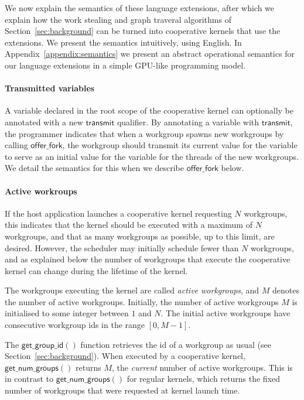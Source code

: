 \documentclass[nocopyrightspace,10pt]{sigplanconf}
\newcommand{\transmit}{\mathsf{transmit}}
\newcommand{\offerfork}{\mathsf{offer\_fork}}
\newcommand{\getgroupid}{\mathsf{get\_group\_id}}
\newcommand{\getnumgroups}{\mathsf{get\_num\_groups}}
\begin{document}
We now explain the semantics of these language extensions, after which
we explain how the work stealing and graph traveral algorithms of
Section~\ref{sec:background} can be turned into cooperative kernels
that use the extensions.  We present the semantics intuitively, using English.
In Appendix~\ref{appendix:semantics} we present an abstract operational semantics for our language extensions in a simple GPU-like programming model.

\paragraph{Transmitted variables}

A variable declared in the root scope of the cooperative kernel can
optionally be annotated with a new $\transmit$ qualifier.  By
annotating a variable with $\transmit$, the programmer indicates that
when a workgroup spawns new workgroups by calling $\offerfork$, the
workgroup should transmit its current value for the variable to serve
as an initial value for the variable for the threads of the new workgroups.  We detail the semantics
for this when we describe $\offerfork$ below.

\paragraph{Active workroups}

If the host application launches a cooperative kernel requesting $N$
workgroups, this indicates that the kernel should be executed with a
maximum of $N$ workgroups, and that as many workgroups as possible, up
to this limit, are desired.  However, the scheduler may initially
schedule fewer than $N$ workgroups, and as explained below the number
of workgroups that execute the cooperative kernel can change during
the lifetime of the kernel.

The workgroups executing the kernel are called \emph{active
  workgroups}, and $M$ denotes the number of active workgroups.
Initially, the number of active workgroups $M$ is initialised to some
integer between $1$ and $N$.  The initial active workgroups have
consecutive workgroup ids in the range $[0, M-1]$.

The $\getgroupid()$ function retrieves the id of a workgroup as usual
(see Section~\ref{sec:background}).  When executed by a cooperative
kernel, $\getnumgroups()$ returns $M$, the \emph{current} number of
active workgroups.  This is in contrast to $\getnumgroups()$ for
regular kernels, which returns the fixed number of workgroups that
were requested at kernel launch time.
\end{document}
